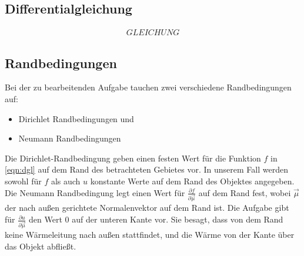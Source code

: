 \documentclass[10pt,a4paper]{article}
\begin{document}
\subsection{Differentialgleichung}
\begin{align}
GLEICHUNG
\label{eqn:dgl}
\end{align}
\subsection{Randbedingungen}
\label{randbedingungen}
Bei der zu bearbeitenden Aufgabe tauchen zwei verschiedene Randbedingungen auf:
\begin{itemize}
\item Dirichlet Randbedingungen und
\item Neumann Randbedingungen
\end{itemize}
Die Dirichlet-Randbedingung geben einen festen Wert für die Funktion $f$ in \ref{eqn:dgl} auf dem Rand des betrachteten Gebietes vor. In unserem Fall werden sowohl für $f$ als auch $u$ konstante Werte auf dem Rand des Objektes angegeben. Die Neumann Randbedingung legt einen Wert für $\frac{\partial f}{\partial \vec{\mu}}$ auf dem Rand fest, wobei $\vec{\mu}$ der nach außen gerichtete Normalenvektor auf dem Rand ist. Die Aufgabe gibt für $\frac{\partial u}{\partial \vec{\mu}}$ den Wert $0$ auf der unteren Kante vor. Sie besagt, dass von dem Rand keine Wärmeleitung nach außen stattfindet, und die Wärme von der Kante über das Objekt abfließt. 

\begin{figure}
\centering

\end{figure}
\end{document}
